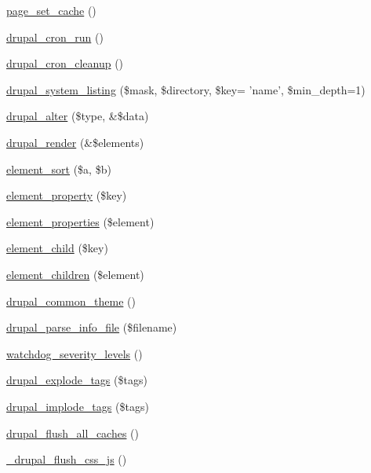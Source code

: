 \begin{CompactItemize}
\item 
\hyperlink{common_8inc_1e3b3fde2d48f8ef01d6ddd0a16fb073}{page\_\-set\_\-cache} ()
\item 
\hyperlink{common_8inc_1d4a4362b30215023a7120b627a9fd4f}{drupal\_\-cron\_\-run} ()
\item 
\hyperlink{common_8inc_9067aaeb503fb9f994d98728130390a2}{drupal\_\-cron\_\-cleanup} ()
\item 
\hyperlink{common_8inc_60d1237b23d4e84a59656003596add4b}{drupal\_\-system\_\-listing} (\$mask, \$directory, \$key= 'name', \$min\_\-depth=1)
\item 
\hyperlink{common_8inc_d41a0d489123ca5b04976d9a3d7e11d4}{drupal\_\-alter} (\$type, \&\$data)
\item 
\hyperlink{common_8inc_05798b44e8d6c496d4bee5cc32fa7851}{drupal\_\-render} (\&\$elements)
\item 
\hyperlink{common_8inc_61f0cc62072ab44aa349478fb7219c74}{element\_\-sort} (\$a, \$b)
\item 
\hyperlink{common_8inc_7a93c74e138f24e5f7e672972644f1c3}{element\_\-property} (\$key)
\item 
\hyperlink{common_8inc_4ae6d339b27757556fe914f9d78d91e5}{element\_\-properties} (\$element)
\item 
\hyperlink{common_8inc_3063341f48382cc5ecce25eb1eaa7a0d}{element\_\-child} (\$key)
\item 
\hyperlink{common_8inc_6e3b741f1d5455829b04c356e3dc59a5}{element\_\-children} (\$element)
\item 
\hyperlink{common_8inc_1263ef82e0da5b85f8203783ed164872}{drupal\_\-common\_\-theme} ()
\item 
\hyperlink{common_8inc_277955232059631211fcfde533ea89d6}{drupal\_\-parse\_\-info\_\-file} (\$filename)
\item 
\hyperlink{common_8inc_fb5d4b58ec7e483153644c0f664e0ca4}{watchdog\_\-severity\_\-levels} ()
\item 
\hyperlink{common_8inc_e5bd302bab285bc819a70737f6121953}{drupal\_\-explode\_\-tags} (\$tags)
\item 
\hyperlink{common_8inc_29df41fde25e9fcace627a628806c978}{drupal\_\-implode\_\-tags} (\$tags)
\item 
\hyperlink{common_8inc_c119432cefbdbb25647944d4ca3f82f8}{drupal\_\-flush\_\-all\_\-caches} ()
\item 
\hyperlink{common_8inc_a53a3c794efc562f46a74688dabf27f6}{\_\-drupal\_\-flush\_\-css\_\-js} ()
\end{CompactItemize}
